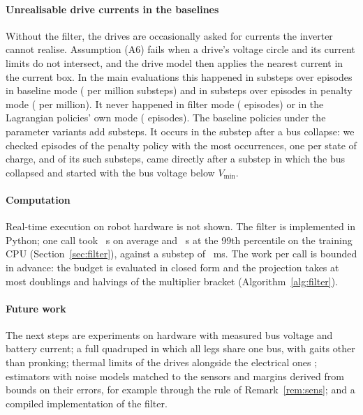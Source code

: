 \paragraph{Unrealisable drive currents in the baselines}
Without the filter, the drives are occasionally asked for currents the inverter cannot realise. Assumption (A6) fails when a drive's voltage circle and its current limits do not intersect, and the drive model then applies the nearest current in the current box. In the main evaluations this happened in  substeps over  episodes in baseline mode ( per million substeps) and in  substeps over  episodes in penalty mode ( per million). It never happened in filter mode ( episodes) or in the Lagrangian policies' own mode ( episodes). The baseline policies under the parameter variants add  substeps. It occurs in the substep after a bus collapse: we checked  episodes of the penalty policy with the most occurrences, one per state of charge, and of its  such substeps,  came directly after a substep in which the bus collapsed and  started with the bus voltage below $V_{\min}$.

\paragraph{Computation}
Real-time execution on robot hardware is not shown. The filter is implemented in Python; one call took ~\textmu s on average and ~\textmu s at the 99th percentile on the training CPU (Section~\ref{sec:filter}), against a substep of ~ms. The work per call is bounded in advance: the budget is evaluated in closed form and the projection takes at most  doublings and  halvings of the multiplier bracket (Algorithm~\ref{alg:filter}).

\paragraph{Future work}
The next steps are experiments on hardware with measured bus voltage and battery current; a full quadruped in which all legs share one bus, with gaits other than pronking; thermal limits of the drives alongside the electrical ones \cite{wan2026thermal,qian2026thermal}; estimators with noise models matched to the sensors and margins derived from bounds on their errors, for example through the rule of Remark~\ref{rem:sens}; and a compiled implementation of the filter.
